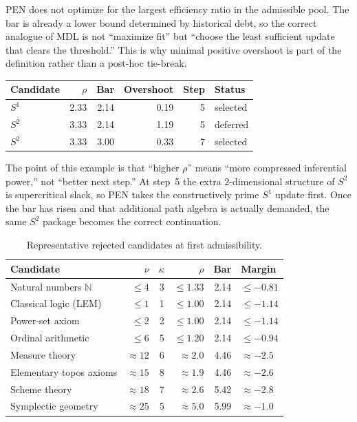 \documentclass[11pt,a4paper]{article}
\theoremstyle{plain}
\theoremstyle{definition}
\theoremstyle{remark}
\newcommand{\N}{\mathbb{N}}
\begin{document}
PEN does not optimize for the largest efficiency ratio in the admissible pool.  The bar is already a lower bound determined by historical debt, so the correct analogue of MDL is not ``maximize fit'' but ``choose the least sufficient update that clears the threshold.''  This is why minimal positive overshoot is part of the definition rather than a post-hoc tie-break.

\begin{center}
\small
\begin{tabular}{@{}lrrrrl@{}}
\toprule
Candidate & $\rho$ & Bar & Overshoot & Step & Status \\
\midrule
$S^1$ & 2.33 & 2.14 & 0.19 & 5 & selected \\
$S^2$ & 3.33 & 2.14 & 1.19 & 5 & deferred \\
$S^2$ & 3.33 & 3.00 & 0.33 & 7 & selected \\
\bottomrule
\end{tabular}
\end{center}

The point of this example is that ``higher $\rho$'' means ``more compressed inferential power,'' not ``better next step.''  At step~5 the extra $2$-dimensional structure of $S^2$ is supercritical slack, so PEN takes the constructively prime $S^1$ update first.  Once the bar has risen and that additional path algebra is actually demanded, the same $S^2$ package becomes the correct continuation.

\begin{table}[tbp]
\centering
\caption{Representative rejected candidates at first admissibility.}
\label{tab:rejected}
\small
\begin{tabular}{@{}lrrrrl@{}}
\toprule
Candidate & $\nu$ & $\kappa$ & $\rho$ & Bar & Margin \\
\midrule
Natural numbers $\N$ & $\le 4$ & 3 & $\le 1.33$ & 2.14 & $\le -0.81$ \\
Classical logic (LEM) & $\le 1$ & 1 & $\le 1.00$ & 2.14 & $\le -1.14$ \\
Power-set axiom & $\le 2$ & 2 & $\le 1.00$ & 2.14 & $\le -1.14$ \\
Ordinal arithmetic & $\le 6$ & 5 & $\le 1.20$ & 2.14 & $\le -0.94$ \\
Measure theory & $\approx 12$ & 6 & $\approx 2.0$ & 4.46 & $\approx -2.5$ \\
Elementary topos axioms & $\approx 15$ & 8 & $\approx 1.9$ & 4.46 & $\approx -2.6$ \\
Scheme theory & $\approx 18$ & 7 & $\approx 2.6$ & 5.42 & $\approx -2.8$ \\
Symplectic geometry & $\approx 25$ & 5 & $\approx 5.0$ & 5.99 & $\approx -1.0$ \\
\bottomrule
\end{tabular}
\end{table}
\end{document}
